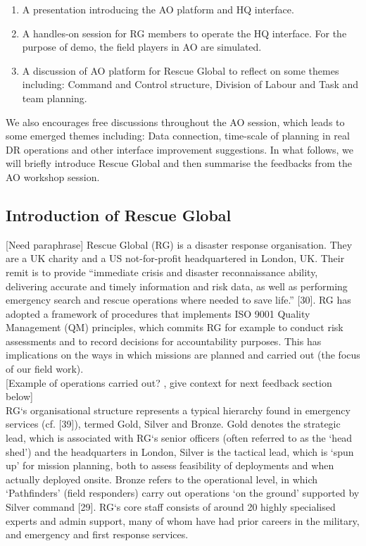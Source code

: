 \begin{enumerate}
	\item A presentation introducing the AO platform and HQ interface.
	\item A handles-on session for RG members to operate the HQ interface. For the purpose of demo, the field players in AO are simulated.
	\item A discussion of AO platform for Rescue Global to reflect on some themes including: Command and Control structure, Division of Labour and Task and team planning.
\end{enumerate} 

We also encourages free discussions throughout the AO session, which leads to some emerged themes including: Data connection, time-scale of planning in real DR operations and other interface improvement suggestions. In what follows, we will briefly introduce Rescue Global and then summarise the feedbacks from the AO workshop session. 


\subsection{Introduction of Rescue Global}
[Need paraphrase] Rescue Global (RG) is a disaster response organisation. They are a UK charity and a US not-for-profit headquartered in London, UK. Their remit is to provide ``immediate crisis and disaster reconnaissance ability, delivering accurate and timely information and risk data, as well as performing emergency search and rescue operations where needed to save life.'' [30]. RG has adopted a framework of procedures that implements ISO 9001 Quality Management (QM) principles, which commits RG for example to conduct risk assessments and to record decisions for accountability purposes. This has implications on the ways in which missions are planned and carried out (the focus of our field work).\\

[Example of operations carried out? , give context for next feedback section below]\\

RG`s organisational structure represents a typical hierarchy found in emergency services (cf. [39]), termed Gold, Silver and Bronze. Gold denotes the strategic lead, which is associated with RG`s senior officers (often referred to as the `head shed') and the headquarters in London, Silver is the tactical lead, which is `spun up' for mission planning, both to assess feasibility of deployments and when actually deployed onsite. Bronze refers to the operational level, in which `Pathfinders' (field responders) carry out operations `on the ground' supported by Silver command [29]. RG`s core staff consists of around 20 highly specialised experts and admin support, many of whom have had prior careers in the military, and emergency and first response services.\\


